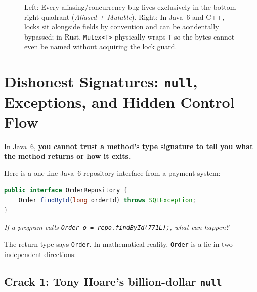\begin{figure}[H]
\caption{Left: Every aliasing/concurrency bug lives exclusively in the bottom-right quadrant (\emph{Aliased + Mutable}). Right: In Java~6 and C++, locks sit alongside fields by convention and can be accidentally bypassed; in Rust, \texttt{Mutex<T>} physically wraps \texttt{T} so the bytes cannot even be named without acquiring the lock guard.}
\label{ch01:fig-aliasing-matrix}
\end{figure}

\section{Dishonest Signatures: \texttt{null}, Exceptions, and Hidden Control Flow}
\label{ch01:null-and-exceptions}

In Java~6, \textbf{you cannot trust a method's type signature to tell you what the method returns or how it exits.}

Here is a one-line Java~6 repository interface from a payment system:

\begin{lstlisting}[language=Java]
public interface OrderRepository {
    Order findById(long orderId) throws SQLException;
}
\end{lstlisting}

\emph{If a program calls \texttt{Order o = repo.findById(771L);}, what can happen?}

The return type says \texttt{Order}. In mathematical reality, \texttt{Order} is a lie in two independent directions:

\subsection{Crack 1: Tony Hoare's billion-dollar \texttt{null}}

